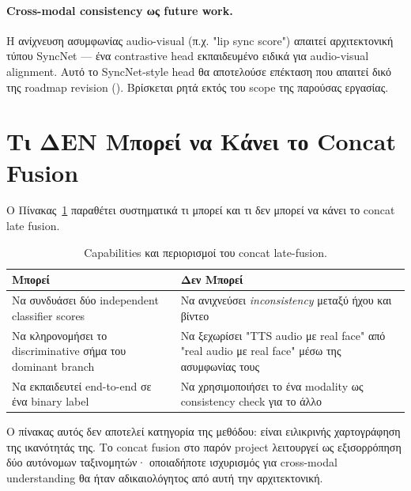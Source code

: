 \paragraph{Cross-modal consistency ως future work.}
Η ανίχνευση ασυμφωνίας audio-visual
(π.χ. "lip sync score") απαιτεί αρχιτεκτονική τύπου SyncNet —
ένα contrastive head εκπαιδευμένο ειδικά για audio-visual alignment.
Αυτό το SyncNet-style head θα αποτελούσε επέκταση
που απαιτεί δικό της roadmap revision
().
Βρίσκεται ρητά εκτός του scope της παρούσας εργασίας.

\section{Τι ΔΕΝ Μπορεί να Κάνει το Concat Fusion}
\label{sec:concat-limitations}

Ο Πίνακας~\ref{tab:concat_fusion_caps} παραθέτει συστηματικά
τι μπορεί και τι δεν μπορεί να κάνει το concat late fusion.

\begin{table}[ht]
  \centering
  \begin{tabular}{p{}p{}}
    \toprule
    Μπορεί & Δεν Μπορεί \\
    \midrule
    Να συνδυάσει δύο independent classifier scores &
    Να ανιχνεύσει \emph{inconsistency} μεταξύ ήχου και βίντεο \\
    Να κληρονομήσει το discriminative σήμα του dominant branch &
    Να ξεχωρίσει "TTS audio με real face" από "real audio με real face"
    μέσω της ασυμφωνίας τους \\
    Να εκπαιδευτεί end-to-end σε ένα binary label &
    Να χρησιμοποιήσει το ένα modality ως consistency check για το άλλο \\
    \bottomrule
  \end{tabular}
  \caption{Capabilities και περιορισμοί του concat late-fusion.}
  \label{tab:concat_fusion_caps}
\end{table}

Ο πίνακας αυτός δεν αποτελεί κατηγορία της μεθόδου:
είναι ειλικρινής χαρτογράφηση της ικανότητάς της.
Το concat fusion στο παρόν project λειτουργεί ως
εξισορρόπηση δύο αυτόνομων ταξινομητών·
οποιαδήποτε ισχυρισμός για cross-modal understanding
θα ήταν αδικαιολόγητος από αυτή την αρχιτεκτονική.

